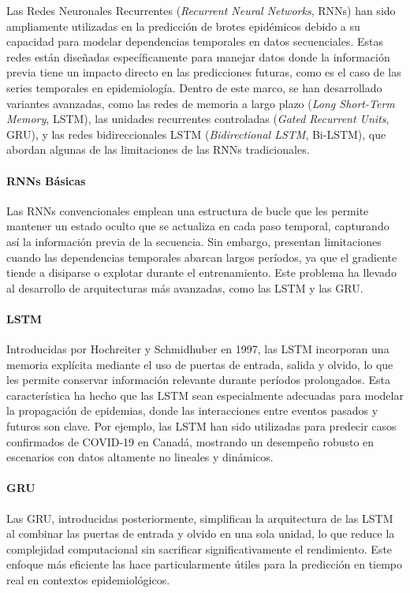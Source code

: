 Las Redes Neuronales Recurrentes (\textit{Recurrent Neural Networks}, RNNs) han sido ampliamente utilizadas en la predicción de brotes epidémicos debido a su capacidad para modelar dependencias temporales en datos secuenciales. Estas redes están diseñadas específicamente para manejar datos donde la información previa tiene un impacto directo en las predicciones futuras, como es el caso de las series temporales en epidemiología. Dentro de este marco, se han desarrollado variantes avanzadas, como las redes de memoria a largo plazo (\textit{Long Short-Term Memory}, LSTM), las unidades recurrentes controladas (\textit{Gated Recurrent Units}, GRU), y las redes bidireccionales LSTM (\textit{Bidirectional LSTM}, Bi-LSTM), que abordan algunas de las limitaciones de las RNNs tradicionales\parencite{Shah2024COVID19FU, Santangelo2023MachineLearning}.

\paragraph{RNNs Básicas}
Las RNNs convencionales emplean una estructura de bucle que les permite mantener un estado oculto que se actualiza en cada paso temporal, capturando así la información previa de la secuencia. Sin embargo, presentan limitaciones cuando las dependencias temporales abarcan largos períodos, ya que el gradiente tiende a disiparse o explotar durante el entrenamiento. Este problema ha llevado al desarrollo de arquitecturas más avanzadas, como las LSTM y las GRU\parencite{Rodriguez2022DataCentric}.

\paragraph{LSTM}
Introducidas por Hochreiter y Schmidhuber en 1997, las LSTM incorporan una memoria explícita mediante el uso de puertas de entrada, salida y olvido, lo que les permite conservar información relevante durante períodos prolongados\parencite{Santangelo2023MachineLearning}. Esta característica ha hecho que las LSTM sean especialmente adecuadas para modelar la propagación de epidemias, donde las interacciones entre eventos pasados y futuros son clave. Por ejemplo, las LSTM han sido utilizadas para predecir casos confirmados de COVID-19 en Canadá, mostrando un desempeño robusto en escenarios con datos altamente no lineales y dinámicos\parencite{Nguyen2023NZSTGNN}.

\paragraph{GRU}
Las GRU, introducidas posteriormente, simplifican la arquitectura de las LSTM al combinar las puertas de entrada y olvido en una sola unidad, lo que reduce la complejidad computacional sin sacrificar significativamente el rendimiento. Este enfoque más eficiente las hace particularmente útiles para la predicción en tiempo real en contextos epidemiológicos\parencite{Santangelo2023MachineLearning, Stergiou2022MachineLearning}.

